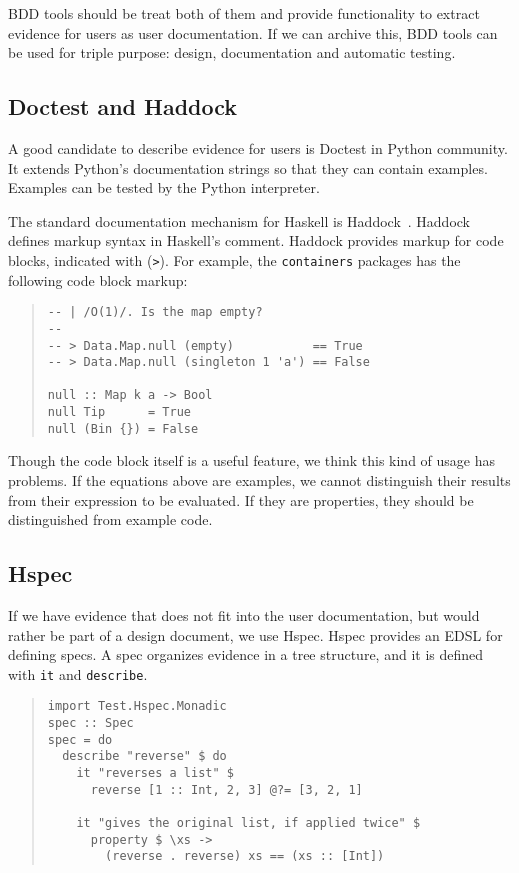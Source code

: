 \documentclass[preprint]{sigplanconf}
\begin{document}
BDD tools should be treat both of them and provide functionality
to extract evidence for users as user documentation.
If we can archive this, BDD tools can be used for
triple purpose: design, documentation and automatic testing.

\subsection{Doctest and Haddock}

A good candidate to describe evidence for users is Doctest in Python community.
It extends Python's documentation strings so that they
can contain examples.
Examples can be tested by the Python interpreter.

The standard documentation mechanism for Haskell is
Haddock~\cite{haddock}.
Haddock defines markup syntax in Haskell's comment.
Haddock provides markup for code blocks, indicated with ({\tt >}).
For example, the {\tt containers} packages has the following code block markup:

\begin{quote}
\small
\begin{verbatim}
-- | /O(1)/. Is the map empty?
--
-- > Data.Map.null (empty)           == True
-- > Data.Map.null (singleton 1 'a') == False

null :: Map k a -> Bool
null Tip      = True
null (Bin {}) = False
\end{verbatim}
\end{quote}

\noindent Though the code block itself is a useful feature,
we think this kind of usage has problems.
If the equations above are examples, we cannot distinguish
their results from their expression to be evaluated.
If they are properties, they should be distinguished
from example code.

\subsection{Hspec}

If we have evidence that does not fit into the user documentation, but
would rather be part of a design document, we use Hspec.  Hspec
provides an EDSL for defining specs.  A spec organizes evidence in a
tree structure, and it is defined with \texttt{it} and
\texttt{describe}.

\begin{quote}
\small
\begin{verbatim}
import Test.Hspec.Monadic
spec :: Spec
spec = do
  describe "reverse" $ do
    it "reverses a list" $
      reverse [1 :: Int, 2, 3] @?= [3, 2, 1]

    it "gives the original list, if applied twice" $
      property $ \xs ->
        (reverse . reverse) xs == (xs :: [Int])
\end{verbatim}
\end{quote}
\end{document}
